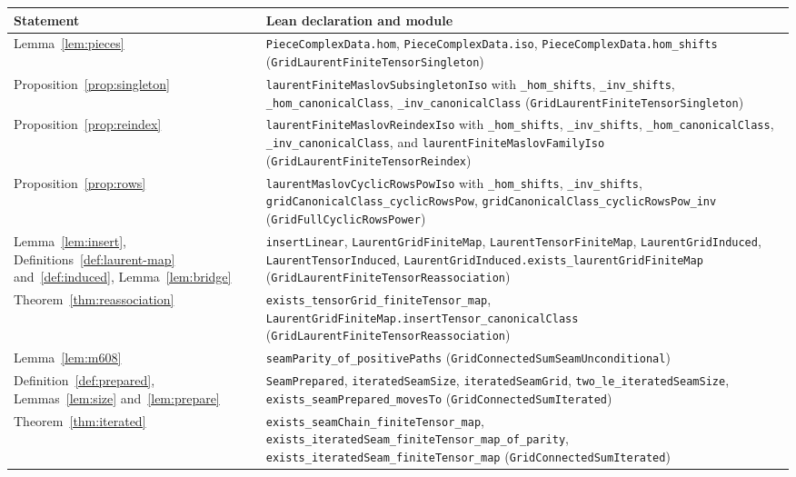 \documentclass[11pt]{amsart}
\theoremstyle{definition}
\theoremstyle{remark}
\newcommand{\lean}[1]{\textnormal{\nolinkurl{#1}}}
\begin{document}
\begin{longtable}{>{\raggedright\arraybackslash}p{}>{\raggedright\arraybackslash}p{}}
\toprule
Statement & Lean declaration and module \\
\midrule
Lemma~\ref{lem:pieces} & \lean{PieceComplexData.hom}, \lean{PieceComplexData.iso},
\lean{PieceComplexData.hom_shifts} (\lean{GridLaurentFiniteTensorSingleton}) \\
Proposition~\ref{prop:singleton} & \lean{laurentFiniteMaslovSubsingletonIso} with
\lean{_hom_shifts}, \lean{_inv_shifts}, \lean{_hom_canonicalClass},
\lean{_inv_canonicalClass} (\lean{GridLaurentFiniteTensorSingleton}) \\
Proposition~\ref{prop:reindex} & \lean{laurentFiniteMaslovReindexIso} with \lean{_hom_shifts},
\lean{_inv_shifts}, \lean{_hom_canonicalClass}, \lean{_inv_canonicalClass}, and
\lean{laurentFiniteMaslovFamilyIso} (\lean{GridLaurentFiniteTensorReindex}) \\
Proposition~\ref{prop:rows} & \lean{laurentMaslovCyclicRowsPowIso} with \lean{_hom_shifts},
\lean{_inv_shifts}, \lean{gridCanonicalClass_cyclicRowsPow},
\lean{gridCanonicalClass_cyclicRowsPow_inv} (\lean{GridFullCyclicRowsPower}) \\
Lemma~\ref{lem:insert}, Definitions~\ref{def:laurent-map} and~\ref{def:induced},
Lemma~\ref{lem:bridge} & \lean{insertLinear}, \lean{LaurentGridFiniteMap},
\lean{LaurentTensorFiniteMap}, \lean{LaurentGridInduced}, \lean{LaurentTensorInduced},
\lean{LaurentGridInduced.exists_laurentGridFiniteMap}
(\lean{GridLaurentFiniteTensorReassociation}) \\
Theorem~\ref{thm:reassociation} & \lean{exists_tensorGrid_finiteTensor_map},
\lean{LaurentGridFiniteMap.insertTensor_canonicalClass}
(\lean{GridLaurentFiniteTensorReassociation}) \\
Lemma~\ref{lem:m608} & \lean{seamParity_of_positivePaths}
(\lean{GridConnectedSumSeamUnconditional}) \\
Definition~\ref{def:prepared}, Lemmas~\ref{lem:size} and~\ref{lem:prepare} & \lean{SeamPrepared},
\lean{iteratedSeamSize}, \lean{iteratedSeamGrid}, \lean{two_le_iteratedSeamSize},
\lean{exists_seamPrepared_movesTo} (\lean{GridConnectedSumIterated}) \\
Theorem~\ref{thm:iterated} & \lean{exists_seamChain_finiteTensor_map},
\lean{exists_iteratedSeam_finiteTensor_map_of_parity},
\lean{exists_iteratedSeam_finiteTensor_map} (\lean{GridConnectedSumIterated}) \\
\bottomrule
\end{longtable}
\end{document}
